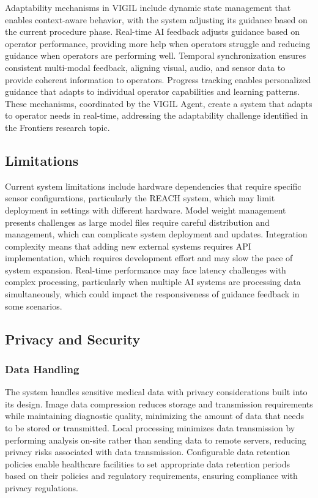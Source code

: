 \documentclass[12pt,a4paper]{article}
\begin{document}
Adaptability mechanisms in VIGIL include dynamic state management that enables context-aware behavior, with the system adjusting its guidance based on the current procedure phase. Real-time AI feedback adjusts guidance based on operator performance, providing more help when operators struggle and reducing guidance when operators are performing well. Temporal synchronization ensures consistent multi-modal feedback, aligning visual, audio, and sensor data to provide coherent information to operators. Progress tracking enables personalized guidance that adapts to individual operator capabilities and learning patterns. These mechanisms, coordinated by the VIGIL Agent, create a system that adapts to operator needs in real-time, addressing the adaptability challenge identified in the Frontiers research topic.

\subsection{Limitations}

Current system limitations include hardware dependencies that require specific sensor configurations, particularly the REACH system, which may limit deployment in settings with different hardware. Model weight management presents challenges as large model files require careful distribution and management, which can complicate system deployment and updates. Integration complexity means that adding new external systems requires API implementation, which requires development effort and may slow the pace of system expansion. Real-time performance may face latency challenges with complex processing, particularly when multiple AI systems are processing data simultaneously, which could impact the responsiveness of guidance feedback in some scenarios.

\subsection{Privacy and Security}

\subsubsection{Data Handling}

The system handles sensitive medical data with privacy considerations built into its design. Image data compression reduces storage and transmission requirements while maintaining diagnostic quality, minimizing the amount of data that needs to be stored or transmitted. Local processing minimizes data transmission by performing analysis on-site rather than sending data to remote servers, reducing privacy risks associated with data transmission. Configurable data retention policies enable healthcare facilities to set appropriate data retention periods based on their policies and regulatory requirements, ensuring compliance with privacy regulations.
\end{document}
